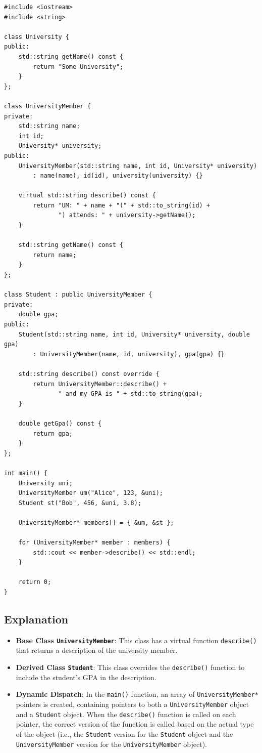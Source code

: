 \documentclass{report}
\begin{document}
\begin{verbatim}
#include <iostream>
#include <string>

class University {
public:
    std::string getName() const {
        return "Some University";
    }
};

class UniversityMember {
private:
    std::string name;
    int id;
    University* university;
public:
    UniversityMember(std::string name, int id, University* university)
        : name(name), id(id), university(university) {}

    virtual std::string describe() const {
        return "UM: " + name + "(" + std::to_string(id) +
               ") attends: " + university->getName();
    }

    std::string getName() const {
        return name;
    }
};

class Student : public UniversityMember {
private:
    double gpa;
public:
    Student(std::string name, int id, University* university, double gpa)
        : UniversityMember(name, id, university), gpa(gpa) {}

    std::string describe() const override {
        return UniversityMember::describe() +
               " and my GPA is " + std::to_string(gpa);
    }

    double getGpa() const {
        return gpa;
    }
};

int main() {
    University uni;
    UniversityMember um("Alice", 123, &uni);
    Student st("Bob", 456, &uni, 3.8);

    UniversityMember* members[] = { &um, &st };

    for (UniversityMember* member : members) {
        std::cout << member->describe() << std::endl;
    }

    return 0;
}
\end{verbatim}

\subsection{Explanation}

\begin{itemize}
	\item \textbf{Base Class \texttt{UniversityMember}}: This class has a virtual function \texttt{describe()} that returns a description of the university member.
	\item \textbf{Derived Class \texttt{Student}}: This class overrides the \texttt{describe()} function to include the student's GPA in the description.
	\item \textbf{Dynamic Dispatch}: In the \texttt{main()} function, an array of \texttt{UniversityMember*} pointers is created, containing pointers to both a \texttt{UniversityMember} object and a \texttt{Student} object. When the \texttt{describe()} function is called on each pointer, the correct version of the function is called based on the actual type of the object (i.e., the \texttt{Student} version for the \texttt{Student} object and the \texttt{UniversityMember} version for the \texttt{UniversityMember} object).
\end{itemize}
\end{document}
